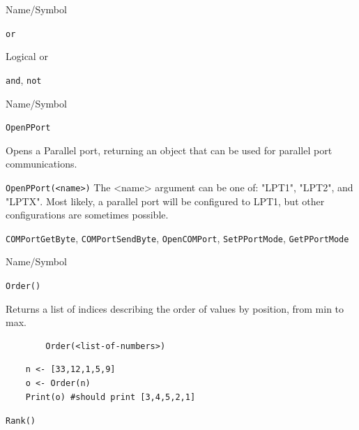 \begin{desc}{Name/Symbol}
\item[Name/Symbol]	\verb+or+                   

\item[Description]	Logical or

\item[Usage]		

\item[Example]	

\item[See Also]	\verb+and+, \verb+not+
\end{desc}



\begin{desc}{Name/Symbol}
\item[Name/Symbol] \verb+OpenPPort+ 

\item[Description]  
  Opens a Parallel  port, returning an object that can be used for parallel port communications.
\item[Usage]       
     \verb+OpenPPort(<name>)+ 
 The <name> argument can be one of: "LPT1", "LPT2", and "LPTX".  Most likely, a parallel port will be configured to 
LPT1, but other configurations are sometimes possible. 
\item[Example]

\item[See Also]
\verb+COMPortGetByte+, \verb+COMPortSendByte+, \verb+OpenCOMPort+, \verb+SetPPortMode+, \verb+GetPPortMode+ 
\end{desc} 





\begin{desc}{Name/Symbol}
\item[Name/Symbol]	\verb+Order()+

\item[Description]	Returns a list of indices describing the order of values by position, from min to max. 

\item[Usage]
\begin{verbatim}
		Order(<list-of-numbers>)
\end{verbatim}

\item[Example]	
\begin{verbatim}
	n <- [33,12,1,5,9]
  	o <- Order(n)
    Print(o) #should print [3,4,5,2,1]
\end{verbatim}

\item[See Also]	\verb+Rank()+
\end{desc}


